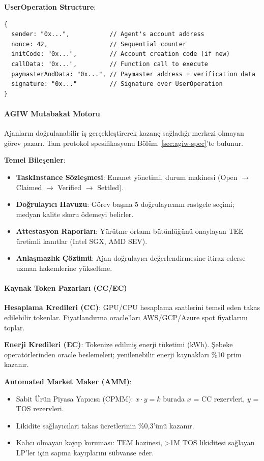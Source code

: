 \documentclass[11pt]{article}
\begin{document}
\begin{itemize}[noitemsep]
\textbf{UserOperation Structure}:
\begin{verbatim}
{
  sender: "0x...",           // Agent's account address
  nonce: 42,                 // Sequential counter
  initCode: "0x...",         // Account creation code (if new)
  callData: "0x...",         // Function call to execute
  paymasterAndData: "0x...", // Paymaster address + verification data
  signature: "0x..."         // Signature over UserOperation
}
\end{verbatim}

\paragraph{AGIW Mutabakat Motoru}
Ajanların doğrulanabilir iş gerçekleştirerek kazanç sağladığı merkezi olmayan görev pazarı. Tam protokol spesifikasyonu Bölüm~\ref{sec:agiw-spec}'te bulunur.

\textbf{Temel Bileşenler}:
\begin{itemize}[noitemsep]
  \item \textbf{TaskInstance Sözleşmesi}: Emanet yönetimi, durum makinesi (Open $\to$ Claimed $\to$ Verified $\to$ Settled).
  \item \textbf{Doğrulayıcı Havuzu}: Görev başına 5 doğrulayıcının rastgele seçimi; medyan kalite skoru ödemeyi belirler.
  \item \textbf{Attestasyon Raporları}: Yürütme ortamı bütünlüğünü onaylayan TEE-üretimli kanıtlar (Intel SGX, AMD SEV).
  \item \textbf{Anlaşmazlık Çözümü}: Ajan doğrulayıcı değerlendirmesine itiraz ederse uzman hakemlerine yükseltme.
\end{itemize}

\paragraph{Kaynak Token Pazarları (CC/EC)}
\textbf{Hesaplama Kredileri (CC)}: GPU/CPU hesaplama saatlerini temsil eden takas edilebilir tokenlar. Fiyatlandırma oracle'ları AWS/GCP/Azure spot fiyatlarını toplar.

\textbf{Enerji Kredileri (EC)}: Tokenize edilmiş enerji tüketimi (kWh). Şebeke operatörlerinden oracle beslemeleri; yenilenebilir enerji kaynakları \%10 prim kazanır.

\textbf{Automated Market Maker (AMM)}:
\begin{itemize}[noitemsep]
  \item Sabit Ürün Piyasa Yapıcısı (CPMM): $x \cdot y = k$ burada $x$ = CC rezervleri, $y$ = TOS rezervleri.
  \item Likidite sağlayıcıları takas ücretlerinin \%0,3'ünü kazanır.
  \item Kalıcı olmayan kayıp koruması: TEM hazinesi, >1M TOS likiditesi sağlayan LP'ler için sapma kayıplarını sübvanse eder.
\end{itemize}


\end{itemize}
\end{document}
